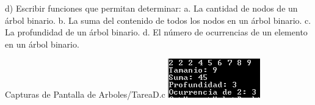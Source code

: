 d) Escribir funciones que permitan determinar:
\newline\hspace*{15mm}
a. La cantidad de nodos de un árbol binario.
\newline\hspace*{15mm}
b. La suma del contenido de todos los nodos en un
árbol binario.
\newline\hspace*{15mm}
c. La profundidad de un árbol binario.
\newline\hspace*{15mm}
d. El número de ocurrencias de un elemento en un
árbol binario.

Capturas de Pantalla de Arboles/TareaD.c
\newline
\includegraphics{Arboles/img/TareaD_1.png}
